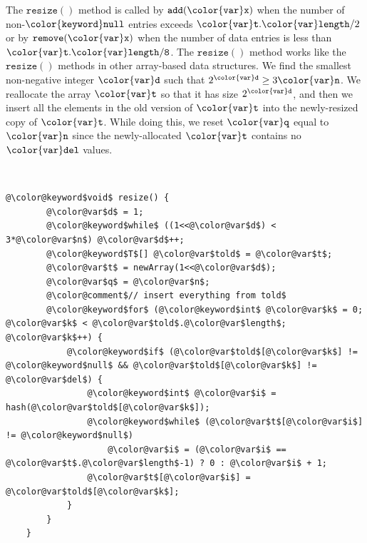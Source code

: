 \documentclass[10pt]{book}
\theoremstyle{plain}
\theoremstyle{definition}
\begin{document}
The \ensuremath{\mathtt{resize()}} method is called by \ensuremath{\mathtt{add({\color{var}x})}} when the number of non-\ensuremath{\mathtt{{\color{keyword}null}}}
entries exceeds $\ensuremath{\mathtt{{\color{var}t}.{\color{var}length}}}/2$ or by \ensuremath{\mathtt{remove({\color{var}x})}} when the number of
data entries is less than \ensuremath{\mathtt{{\color{var}t}.{\color{var}length}/8}}.  The \ensuremath{\mathtt{resize()}} method works
like the \ensuremath{\mathtt{resize()}} methods in other array-based data structures.
We find the smallest non-negative integer \ensuremath{\mathtt{{\color{var}d}}} such that $2^{\ensuremath{\mathtt{{\color{var}d}}}}
\ge 3\ensuremath{\mathtt{{\color{var}n}}}$.  We reallocate the array \ensuremath{\mathtt{{\color{var}t}}} so that it has size $2^{\ensuremath{\mathtt{{\color{var}d}}}}$,
and then we insert all the elements in the old version of \ensuremath{\mathtt{{\color{var}t}}} into the
newly-resized copy of \ensuremath{\mathtt{{\color{var}t}}}.  While doing this, we reset \ensuremath{\mathtt{{\color{var}q}}} equal to \ensuremath{\mathtt{{\color{var}n}}}
since the newly-allocated \ensuremath{\mathtt{{\color{var}t}}} contains no \ensuremath{\mathtt{{\color{var}del}}} values.


 \ \vspace{.5ex}\begin{Verbatim}[gobble=1,tabsize=2,frame=single,framerule=1.2pt,commandchars=\\@\$,label=\texttt{LinearHashTable},labelposition=topline]
	@\color@keyword$void$ resize() {
		@\color@var$d$ = 1;
		@\color@keyword$while$ ((1<<@\color@var$d$) < 3*@\color@var$n$) @\color@var$d$++;
		@\color@keyword$T$[] @\color@var$told$ = @\color@var$t$;
		@\color@var$t$ = newArray(1<<@\color@var$d$);
		@\color@var$q$ = @\color@var$n$;
		@\color@comment$// insert everything from told$
		@\color@keyword$for$ (@\color@keyword$int$ @\color@var$k$ = 0; @\color@var$k$ < @\color@var$told$.@\color@var$length$; @\color@var$k$++) {
			@\color@keyword$if$ (@\color@var$told$[@\color@var$k$] != @\color@keyword$null$ && @\color@var$told$[@\color@var$k$] != @\color@var$del$) {
				@\color@keyword$int$ @\color@var$i$ = hash(@\color@var$told$[@\color@var$k$]);
				@\color@keyword$while$ (@\color@var$t$[@\color@var$i$] != @\color@keyword$null$) 
					@\color@var$i$ = (@\color@var$i$ == @\color@var$t$.@\color@var$length$-1) ? 0 : @\color@var$i$ + 1;
				@\color@var$t$[@\color@var$i$] = @\color@var$told$[@\color@var$k$];
			}
		}
	}
\end{Verbatim}
\end{document}
